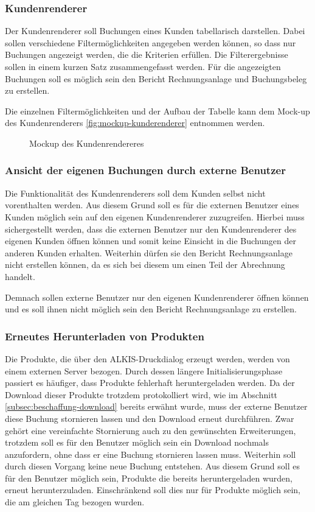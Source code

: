 \subsubsection{Kundenrenderer}
Der Kundenrenderer soll Buchungen eines Kunden tabellarisch darstellen.
Dabei sollen verschiedene Filtermöglichkeiten angegeben werden können, so dass nur Buchungen angezeigt werden, die die Kriterien erfüllen.
Die Filterergebnisse sollen in einem kurzen Satz zusammengefasst werden.
Für die angezeigten Buchungen soll es möglich sein den Bericht Rechnungsanlage und Buchungsbeleg zu erstellen.

Die einzelnen Filtermöglichkeiten und der Aufbau der Tabelle kann dem Mock-up des Kundenrenderers \vref{fig:mockup-kunderenderer} entnommen werden. 

\begin{figure}[htb]
	\centering
	\caption{Mockup des Kundenrendereres}
	\label{fig:mockup-kunderenderer}
\end{figure}

\subsubsection{Ansicht der eigenen Buchungen durch externe Benutzer}
Die Funktionalität des Kundenrenderers soll dem Kunden selbst nicht vorenthalten werden.
Aus diesem Grund soll es für die externen Benutzer eines Kunden möglich sein auf den eigenen Kundenrenderer zuzugreifen.
Hierbei muss sichergestellt werden, dass die externen Benutzer nur den Kundenrenderer des eigenen Kunden öffnen können und somit keine Einsicht in die Buchungen der anderen Kunden erhalten. 
Weiterhin dürfen sie den Bericht Rechnungsanlage nicht erstellen können, da es sich bei diesem um einen Teil der Abrechnung handelt.

Demnach sollen externe Benutzer nur den eigenen Kundenrenderer öffnen können und es soll ihnen nicht möglich sein den Bericht Rechnungsanlage zu erstellen.

\subsubsection{Erneutes Herunterladen von Produkten}
Die Produkte, die über den ALKIS-Druckdialog erzeugt werden, werden von einem externen Server bezogen.
Durch dessen längere Initialisierungsphase passiert es häufiger, dass Produkte fehlerhaft heruntergeladen werden.
Da der Download dieser Produkte trotzdem protokolliert wird, wie im Abschnitt \vref{subsec:beschaffung-download} bereits erwähnt wurde, muss der externe Benutzer diese Buchung stornieren lassen und den Download erneut durchführen.
Zwar gehört eine vereinfachte Stornierung auch zu den gewünschten Erweiterungen, trotzdem soll es für den Benutzer möglich sein ein Download nochmals anzufordern, ohne dass er eine Buchung stornieren lassen muss.
Weiterhin soll durch diesen Vorgang keine neue Buchung entstehen.
Aus diesem Grund soll es für den Benutzer möglich sein, Produkte die bereits heruntergeladen wurden, erneut herunterzuladen. Einschränkend soll dies nur für Produkte möglich sein, die am gleichen Tag bezogen wurden. 

